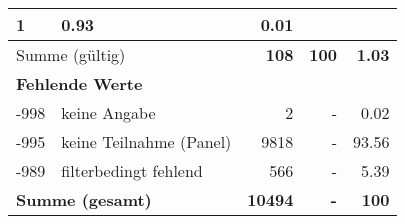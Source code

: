 \begin{longtable}{lXrrr}
       \num{1} &
       \num[round-mode=places,round-precision=2]{0.93} &
         \num[round-mode=places,round-precision=2]{0.01} \\
     \midrule
     \multicolumn{2}{l}{Summe (gültig)} &
       \textbf{\num{108}} &
     \textbf{\num{100}} &
       \textbf{\num[round-mode=places,round-precision=2]{1.03}} \\
     \multicolumn{5}{l}{\textbf{Fehlende Werte}}\\
       -998 &
       keine Angabe &
         \num{2} &
        - &
         \num[round-mode=places,round-precision=2]{0.02} \\
       -995 &
       keine Teilnahme (Panel) &
         \num{9818} &
        - &
         \num[round-mode=places,round-precision=2]{93.56} \\
       -989 &
       filterbedingt fehlend &
         \num{566} &
        - &
         \num[round-mode=places,round-precision=2]{5.39} \\
     \midrule
     \multicolumn{2}{l}{\textbf{Summe (gesamt)}} &
          \textbf{\num{10494}} &
        \textbf{-} &
        \textbf{\num{100}} \\
     \bottomrule
     \end{longtable}
     
